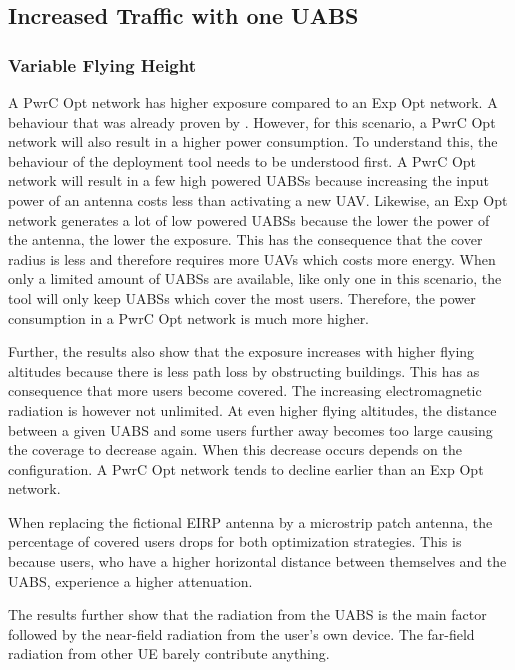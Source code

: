 \documentclass[twocolumn]{phdsymp} %
\begin{document}
\subsection{Increased Traffic with one UABS}
\subsubsection{Variable Flying Height}
A \gls{PwrC Opt} network has higher exposure compared to an \gls{Exp Opt} network.
A behaviour that was already proven by \cite{J1}. 
However, for this scenario, a \gls{PwrC Opt} network will also result in a higher power consumption. 
To understand this, the behaviour of the deployment tool needs to be understood first. 
A \gls{PwrC Opt} network will result in a few high powered \gls{UABS}s because increasing the input power of an antenna costs 
less than activating a new  \gls{UAV}. Likewise, an \gls{Exp Opt} network 
generates a lot of low powered \gls{UABS}s because the lower the power of the antenna, the lower the exposure. This has the consequence that the cover radius 
is less and therefore requires more \gls{UAV}s which costs more energy.
When only a limited amount of \gls{UABS}s are available, 
like only one in this scenario, the tool will only keep \gls{UABS}s which cover the most users. 
Therefore, the power consumption in a \gls{PwrC Opt} network is much more higher. 

Further, the results also show that the exposure increases with higher flying altitudes
because there is less path loss by obstructing buildings. This has as consequence that  
more users become covered. 
The increasing electromagnetic radiation is however not unlimited.
At even higher
flying altitudes, the distance between a given \gls{UABS} and some users further away becomes too large causing the 
coverage to decrease again. When this decrease occurs depends on the configuration. A \gls{PwrC Opt} 
network tends to decline earlier than an \gls{Exp Opt} network.

When replacing the fictional \gls{EIRP} antenna by a microstrip patch antenna, the percentage of covered users drops for both 
optimization strategies. This is because users, who have a higher horizontal distance between themselves and the \gls{UABS}, 
experience a higher attenuation.

The results further show  
that the radiation from the \gls{UABS} is the main factor followed by the near-field radiation from the user's own device.
The far-field radiation from other \gls{UE} barely contribute anything.
\end{document}
